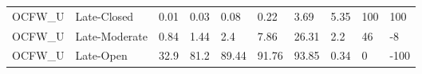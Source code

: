 \begin{sidewaystable}[!htbp]
\begin{tabular}{@{}llllllllll@{}}
\small OCFW\_U         & Late-Closed          & 0.01   & 0.03    & 0.08    & 0.22    & 3.69     & 5.35                                                      & \small 100                                                     & 100             \\
\small OCFW\_U         & Late-Moderate        & 0.84   & 1.44    & 2.4     & 7.86    & 26.31    & 2.2                                                       & \small 46                                                      & -8              \\
\small OCFW\_U         & Late-Open            & 32.9   & 81.2    & 89.44   & 91.76   & 93.85    & 0.34                                                      & 0                                                       & -100            \\
\bottomrule
\end{tabular}
\end{sidewaystable}



